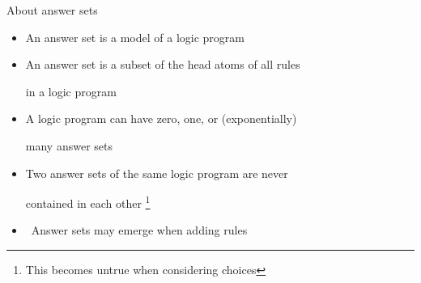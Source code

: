 \begin{frame}{About answer sets}
  \bigskip
  \begin{itemize}
  \item An answer set is a model of a logic program
    \smallskip
  \item An answer set is a subset of the head atoms of all rules\par in a logic program
    \smallskip
  \item A logic program can have zero, one, or (exponentially)\par many answer sets
    \smallskip
  \item Two answer sets of the same logic program are never\par contained in each other
    \footnote{This becomes untrue when considering choices}
    \bigskip
  \item<2->  \ Answer sets may emerge when adding rules
  \end{itemize}
\end{frame}
%

